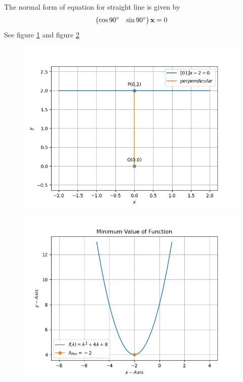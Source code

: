 \documentclass[12pt]{article}
\newcommand{\myvec}[1]{\ensuremath{\begin{pmatrix}#1\end{pmatrix}}}
\let\vec\mathbf
\begin{document}
The normal form of equation for straight line is given by 
\begin{align}
	\myvec{\cos{90}\degree&\sin{90}\degree}\vec{x} = 0
\end{align}
See figure \ref{fig:Fig1} and figure \ref{fig:Fig2}
\begin{figure}[!h]
	\begin{center} 
	    \includegraphics[width=\columnwidth]{figs/line/opt1}
	\end{center}
\caption{}
\label{fig:Fig1}
\end{figure}
\begin{figure}[!h]
	\begin{center} 
	    \includegraphics[width=\columnwidth]{figs/grad/opt2}
	\end{center}
\caption{}
\label{fig:Fig2}
\end{figure}
\end{document}
